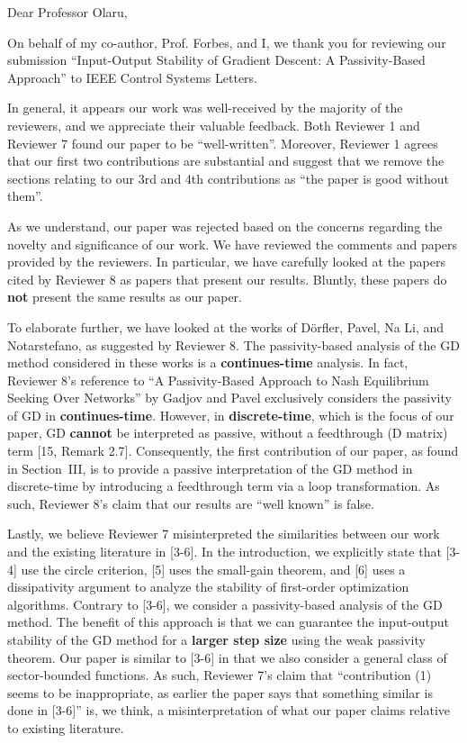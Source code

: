 \thispagestyle{empty}
\setcounter{page}{0}
\begin{flushleft}
    Dear Professor Olaru,

    On behalf of my co-author, Prof. Forbes, and I, we thank you for reviewing our submission ``Input-Output Stability of Gradient Descent: A Passivity-Based Approach'' to IEEE Control Systems Letters.

    In general, it appears our work was well-received by the majority of the reviewers, and we appreciate their valuable feedback. Both Reviewer 1 and Reviewer 7 found our paper to be ``well-written''. Moreover, Reviewer 1 agrees that our first two contributions are substantial and suggest that we remove the sections relating to our 3rd and 4th contributions as ``the paper is good without them''.
    
    As we understand, our paper was rejected based on the concerns regarding the novelty and significance of our work. We have reviewed the comments and papers provided by the reviewers. In particular, we have carefully looked at the papers cited by Reviewer 8 as papers that present our results. Bluntly, these papers do \textbf{not} present the same results as our paper.

    To elaborate further, we have looked at the works of Dörfler, Pavel, Na Li, and Notarstefano, as suggested by Reviewer 8. The passivity-based analysis of the GD method considered in these works is a \textbf{continues-time} analysis. In fact, Reviewer 8's reference to ``A Passivity-Based Approach to Nash Equilibrium Seeking Over Networks'' by Gadjov and Pavel exclusively considers the passivity of GD in \textbf{continues-time}. However, in \textbf{discrete-time}, which is the focus of our paper, GD \textbf{cannot} be interpreted as passive, without a feedthrough (D matrix) term [15, Remark 2.7]. Consequently, the first contribution of our paper, as found in Section~III, is to provide a passive interpretation of the GD method in discrete-time by introducing a feedthrough term via a loop transformation. As such, Reviewer 8's claim that our results are ``well known'' is false.

    Lastly, we believe Reviewer 7 misinterpreted the similarities between our work and the existing literature in [3-6]. In the introduction, we explicitly state that [3-4] use the circle criterion, [5] uses the small-gain theorem, and [6] uses a dissipativity argument to analyze the stability of first-order optimization algorithms. Contrary to [3-6], we consider a passivity-based analysis of the GD method. The benefit of this approach is that we can guarantee the input-output stability of the GD method for a \textbf{larger step size} using the weak passivity theorem. Our paper is similar to [3-6] in that we also consider a general class of sector-bounded functions. As such, Reviewer 7's claim that ``contribution (1) seems to be inappropriate, as earlier the paper says that something similar is done in [3-6]'' is, we think, a misinterpretation of what our paper claims relative to existing literature.


\end{flushleft}
